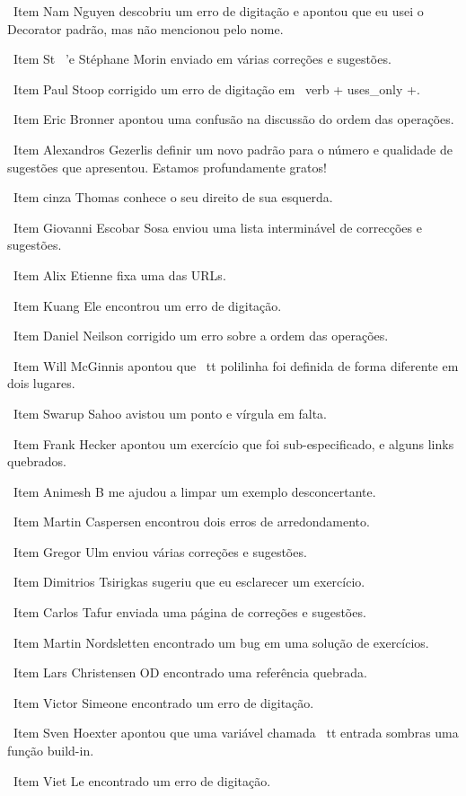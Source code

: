\documentclass[10pt]{book}
\begin{document}
\begin {itemize}
\ Item Nam Nguyen descobriu um erro de digitação e apontou que eu usei o Decorator
padrão, mas não mencionou pelo nome.

\ Item St \ '{e} Stéphane Morin enviado em várias correções e sugestões.

\ Item Paul Stoop corrigido um erro de digitação em \ verb + uses_only +.

\ Item Eric Bronner apontou uma confusão na discussão do
ordem das operações.

\ Item Alexandros Gezerlis definir um novo padrão para o número e
qualidade de sugestões que apresentou. Estamos profundamente gratos!

\ Item cinza Thomas conhece o seu direito de sua esquerda.

\ Item Giovanni Escobar Sosa enviou uma lista interminável de correcções e
sugestões.

\ Item Alix Etienne fixa uma das URLs.

\ Item Kuang Ele encontrou um erro de digitação.

\ Item Daniel Neilson corrigido um erro sobre a ordem das operações.

\ Item Will McGinnis apontou que {\ tt polilinha} foi definida
de forma diferente em dois lugares.

\ Item Swarup Sahoo avistou um ponto e vírgula em falta.

\ Item Frank Hecker apontou um exercício que foi sub-especificado, e
alguns links quebrados.

\ Item Animesh B me ajudou a limpar um exemplo desconcertante.

\ Item Martin Caspersen encontrou dois erros de arredondamento.

\ Item Gregor Ulm enviou várias correções e sugestões.

\ Item Dimitrios Tsirigkas sugeriu que eu esclarecer um exercício.

\ Item Carlos Tafur enviada uma página de correções e sugestões.

\ Item Martin Nordsletten encontrado um bug em uma solução de exercícios.

\ Item Lars Christensen OD encontrado uma referência quebrada.

\ Item Victor Simeone encontrado um erro de digitação.

\ Item Sven Hoexter apontou que uma variável chamada {\ tt entrada}
sombras uma função build-in.

\ Item Viet Le encontrado um erro de digitação.


\end{itemize}
\end{document}
